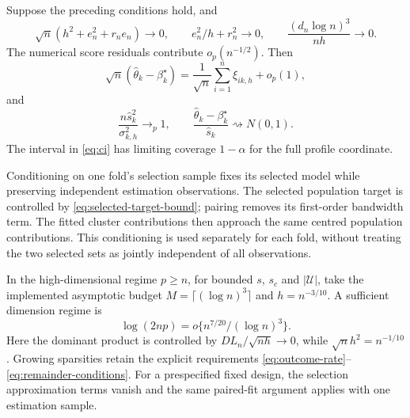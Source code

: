 \begin{theorem}\label{thm:bahadur}
Suppose the preceding conditions hold, and
\begin{equation}\label{eq:remainder-conditions}
 \sqrt n(h^2+e_n^2+r_ne_n)\to0,\qquad
 e_n^2/h+r_n^2\to0,\qquad
 \frac{(d_n\log n)^3}{nh}\to0.
\end{equation}
The numerical score residuals contribute $o_p(n^{-1/2})$. Then
\begin{equation}\label{eq:bahadur}
 \sqrt n(\widehat\theta_k-\beta_k^\star)
       =\frac1{\sqrt n}\sum_{i=1}^n\xi_{ik,h}+o_p(1),
\end{equation}
and
\begin{equation}\label{eq:normality}
 \frac{n\widehat s_k^2}{\sigma_{k,h}^2}\longrightarrow_p1,
 \qquad
 \frac{\widehat\theta_k-\beta_k^\star}{\widehat s_k}
                 \rightsquigarrow N(0,1).
\end{equation}
The interval in \eqref{eq:ci} has limiting coverage $1-\alpha$ for
the full profile coordinate.
\end{theorem}

Conditioning on one fold's selection sample fixes its selected model
while preserving independent estimation observations. The selected
population target is controlled by
\eqref{eq:selected-target-bound}; pairing removes its first-order
bandwidth term. The fitted cluster contributions then approach the
same centred population contributions. This conditioning is used
separately for each fold, without treating the two selected sets as
jointly independent of all observations.

In the high-dimensional regime $p\geq n$, for bounded $s$, $s_c$ and
$|\mathcal U|$, take the implemented
asymptotic budget $M=\lceil(\log n)^3\rceil$ and $h=n^{-3/10}$.
A sufficient dimension regime is
\begin{equation}\label{eq:feasible-regime}
 \log(2np)=o\{n^{7/20}/(\log n)^3\}.
\end{equation}
Here the dominant product is controlled by
$D L_n/\sqrt{nh}\to0$, while $\sqrt n h^2=n^{-1/10}$.
Growing sparsities retain the explicit requirements
\eqref{eq:outcome-rate}--\eqref{eq:remainder-conditions}. For a
prespecified fixed design, the selection approximation terms vanish
and the same paired-fit argument applies with one estimation sample.
